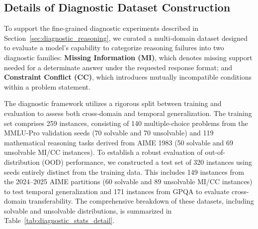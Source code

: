 \subsection{Details of Diagnostic Dataset Construction}
\label{sec:appendix_data_detail}

To support the fine-grained diagnostic experiments described in Section~\ref{sec:diagnostic_reasoning}, we curated a multi-domain dataset designed to evaluate a model's capability to categorize reasoning failures into two diagnostic families: \textbf{Missing Information (MI)}, which denotes missing support needed for a determinate answer under the requested response format; and \textbf{Constraint Conflict (CC)}, which introduces mutually incompatible conditions within a problem statement.

The diagnostic framework utilizes a rigorous split between training and evaluation to assess both cross-domain and temporal generalization. The training set comprises 259 instances, consisting of 140 multiple-choice problems from the MMLU-Pro validation seeds (70 solvable and 70 unsolvable) and 119 mathematical reasoning tasks derived from AIME 1983 (50 solvable and 69 unsolvable MI/CC instances). To establish a robust evaluation of out-of-distribution (OOD) performance, we constructed a test set of 320 instances using seeds entirely distinct from the training data. This includes 149 instances from the 2024--2025 AIME partitions (60 solvable and 89 unsolvable MI/CC instances) to test temporal generalization and 171 instances from GPQA to evaluate cross-domain transferability. The comprehensive breakdown of these datasets, including solvable and unsolvable distributions, is summarized in Table~\ref{tab:diagnostic_stats_detail}.

\begin{table}[h]
\centering
\small
{}
\caption{Detailed dataset statistics for fine-grained diagnostic reasoning.}
\label{tab:diagnostic_stats_detail}
\end{table}


